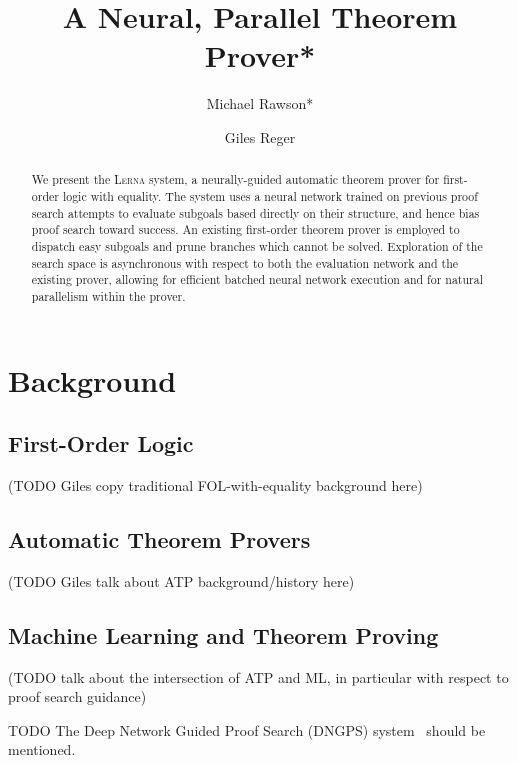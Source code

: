 \documentclass[runningheads]{llncs}
\newcommand{\lerna}{\textsc{Lerna}}
\begin{document}
\title{A Neural, Parallel Theorem Prover*}
\author{
	Michael Rawson* \and
	Giles Reger
}
\maketitle

\begin{abstract}
	We present the \lerna{} system, a neurally-guided automatic theorem prover for first-order logic with equality.
	The system uses a neural network trained on previous proof search attempts to evaluate subgoals based directly on their structure, and hence bias proof search toward success.
	An existing first-order theorem prover is employed to dispatch easy subgoals and prune branches which cannot be solved.
	Exploration of the search space is asynchronous with respect to both the evaluation network and the existing prover, allowing for efficient batched neural network execution and for natural parallelism within the prover.
\end{abstract}

\section{Background}

\subsection{First-Order Logic}
(TODO Giles copy traditional FOL-with-equality background here)

\subsection{Automatic Theorem Provers}
(TODO Giles talk about ATP background/history here)

\subsection{Machine Learning and Theorem Proving}
(TODO talk about the intersection of ATP and ML, in particular with respect to proof search guidance)

TODO The Deep Network Guided Proof Search (DNGPS) system~\cite{DNGPS} should be mentioned.
\end{document}
